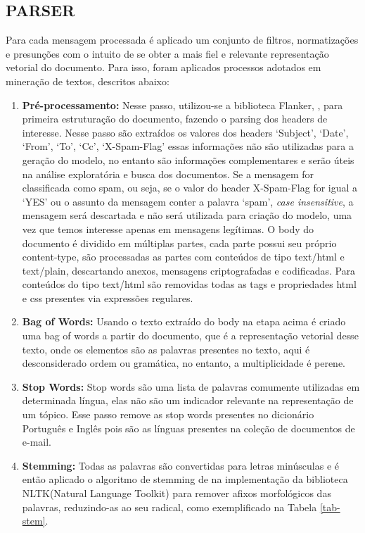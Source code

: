 \documentclass[12pt,a4paper]{article}
\begin{document}
\subsection{PARSER}
Para cada mensagem processada é aplicado um conjunto de filtros, normatizações e presunções com o intuito de se obter a mais fiel e relevante representação vetorial do documento.
 Para isso, foram aplicados processos adotados em mineração de textos, descritos abaixo:

\begin{enumerate}
\item \textbf{Pré-processamento:} Nesse passo, utilizou-se a biblioteca Flanker, , para primeira estruturação do documento, fazendo o parsing dos headers de interesse. Nesse passo são extraídos os valores dos headers ‘Subject’, ‘Date’, ‘From’, ‘To’, ‘Cc’, ‘X-Spam-Flag’ essas informações não são utilizadas para a geração do modelo,
 no entanto são informações complementares e serão úteis na análise exploratória e busca dos documentos. Se a mensagem for classificada como spam, ou seja, 
 se o valor do header X-Spam-Flag for igual a ‘YES’ ou o assunto da mensagem conter a palavra ‘spam’, \textit{case insensitive}, a mensagem será descartada e não será utilizada para criação do modelo,
 uma vez que temos interesse apenas em mensagens legítimas. O body do documento é dividido em múltiplas partes, cada parte possui seu próprio content-type,
 são processadas as partes com conteúdos de tipo text/html e text/plain, descartando anexos, mensagens criptografadas e codificadas. 
 Para conteúdos do tipo text/html são removidas todas as tags e propriedades html e css presentes via expressões regulares.
\item \textbf{Bag of Words:} Usando o texto extraído do body na etapa acima é criado uma bag of words a partir do documento, que é a representação vetorial desse texto,
 onde os elementos são as palavras presentes no texto, aqui é desconsiderado ordem ou gramática, no entanto, a multiplicidade é perene.
\item \textbf{Stop Words:} Stop words são uma lista de palavras comumente utilizadas em determinada língua, elas não são um indicador relevante na representação de um tópico.
 Esse passo remove as stop words presentes no dicionário Português e Inglês pois são as línguas presentes na coleção de documentos de e-mail.
\item \textbf{Stemming:} Todas as palavras são convertidas para letras minúsculas e é então aplicado o algoritmo de stemming de 
 na implementação da biblioteca NLTK(Natural Language Toolkit)  para remover afixos morfológicos das palavras, reduzindo-as ao seu radical, como exemplificado na Tabela \ref{tab-stem}.



\end{enumerate}
\end{document}
